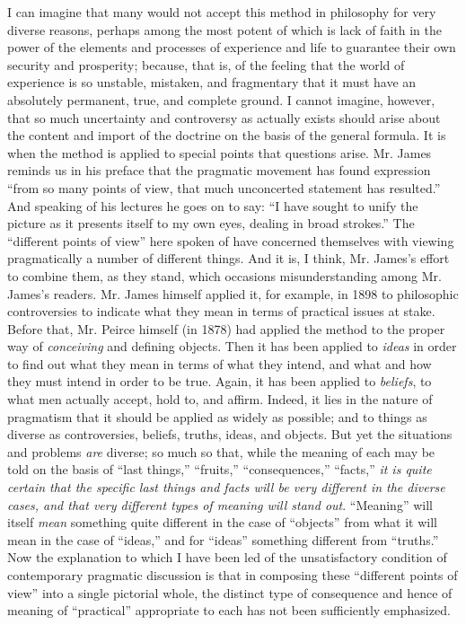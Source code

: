 \documentclass[12pt]{article}
\begin{document}
I can imagine that many would not accept this method in philosophy for
very diverse reasons, perhaps among the most potent of which is lack
of faith in the power of the elements and processes of experience and
life to guarantee their own security and prosperity; because, that is,
of the feeling that the world of experience is so unstable, mistaken,
and fragmentary that it must have an absolutely permanent, true, and
complete ground. I cannot imagine, however, that so much uncertainty
and controversy as actually exists should arise about the content and
import of the doctrine on the basis of the general formula. It is when
the method is applied to special points that questions arise. Mr.
James reminds us in his preface that the pragmatic movement has found
expression ``from so many points of view, that much unconcerted
statement has resulted.'' And speaking of his lectures he goes on to
say: ``I have sought to unify the picture as it presents itself to my
own eyes, dealing in broad strokes.'' The ``different points of view''
here spoken of have concerned themselves with viewing pragmatically a
number of different things. And it is, I think, Mr. James's effort to
combine them, as they stand, which occasions misunderstanding among
Mr. James's readers. Mr. James himself applied it, for example, in
1898 to philosophic controversies to indicate what they mean in terms
of practical issues at stake. Before that, Mr. Peirce himself (in
1878) had applied the method to the proper way of \emph{conceiving} and
defining objects. Then it has been applied to \emph{ideas} in order to find
out what they mean in terms of what they intend, and what and how they
must intend in order to be true. Again, it has been applied to
\emph{beliefs}, to what men actually accept, hold to, and affirm. Indeed,
it lies in the nature of pragmatism that it should be applied as
widely as possible; and to things as diverse as controversies,
beliefs, truths, ideas, and objects. But yet the situations and
problems \emph{are} diverse; so much so that, while the meaning of each may
be told on the basis of ``last things,'' ``fruits,'' ``consequences,''
``facts,'' \emph{it is quite certain that the specific last things and facts
will be very different in the diverse cases, and that very different
types of meaning will stand out}. ``Meaning'' will itself \emph{mean}
something quite different in the case of ``objects'' from what it will
mean in the case of ``ideas,'' and for ``ideas'' something different from
``truths.'' Now the explanation to which I have been led of the
unsatisfactory condition of contemporary pragmatic discussion is that
in composing these ``different points of view'' into a single pictorial
whole, the distinct type of consequence and hence of meaning of
``practical'' appropriate to each has not been sufficiently emphasized.
\end{document}
